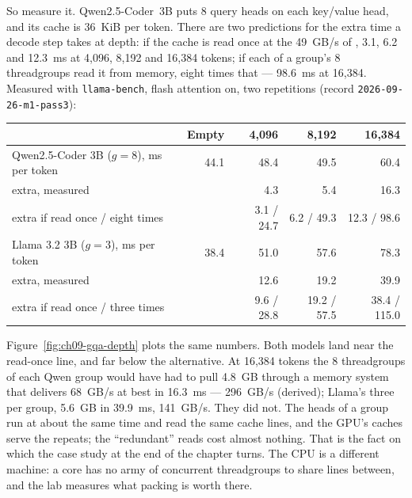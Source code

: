 So measure it. Qwen2.5-Coder~3B puts 8 query heads on each key/value head, and
its cache is 36~KiB per token. There are two predictions for the extra time a
decode step takes at depth: if the cache is read once at the
49~GB/s of , 3.1, 6.2 and 12.3~ms at 4,096, 8,192 and
16,384 tokens; if each of a group's 8 threadgroups read it from memory, eight
times that --- 98.6~ms at 16,384. Measured with \texttt{llama-bench}, flash
attention on, two repetitions (record \texttt{2026-09-26-m1-pass3}):

\begin{center}\small
\begin{tabular}{@{}lrrrr@{}}
\toprule
 & Empty & 4,096 & 8,192 & 16,384 \\
\midrule
Qwen2.5-Coder 3B ($g = 8$), ms per token & 44.1 & 48.4 & 49.5 & 60.4 \\
\quad extra, measured & & 4.3 & 5.4 & 16.3 \\
\quad extra if read once / eight times & & 3.1 / 24.7 & 6.2 / 49.3 & 12.3 / 98.6 \\
Llama 3.2 3B ($g = 3$), ms per token & 38.4 & 51.0 & 57.6 & 78.3 \\
\quad extra, measured & & 12.6 & 19.2 & 39.9 \\
\quad extra if read once / three times & & 9.6 / 28.8 & 19.2 / 57.5 & 38.4 / 115.0 \\
\bottomrule
\end{tabular}
\end{center}


\noindent Figure~\ref{fig:ch09-gqa-depth} plots the same numbers. Both models land near the read-once line, and far below the
alternative. At 16,384 tokens the 8 threadgroups of each Qwen group would have
had to pull 4.8~GB through a memory system that delivers 68~GB/s at best in
16.3~ms --- 296~GB/s (derived); Llama's three per group, 5.6~GB in 39.9~ms,
141~GB/s. They did not. The heads of a group run at about
the same time and read the same cache lines, and the GPU's caches serve the
repeats; the ``redundant'' reads cost almost nothing. That is the fact on which
the case study at the end of the chapter turns. The CPU is a different machine:
a core has no army of concurrent threadgroups to share lines between, and the
lab measures what packing is worth there.

